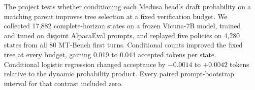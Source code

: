 The project tests whether conditioning each Medusa head's draft probability on a matching parent improves tree selection at a fixed verification budget. We collected 17,882 complete-horizon states on a frozen Vicuna-7B model, trained and tuned on disjoint AlpacaEval prompts, and replayed five policies on 4,280 states from all 80 MT-Bench first turns. Conditional counts improved the fixed tree at every budget, gaining 0.019 to 0.044 accepted tokens per state. Conditional logistic regression changed acceptance by $-0.0014$ to $+0.0042$ tokens relative to the dynamic probability product. Every paired prompt-bootstrap interval for that contrast included zero. 
